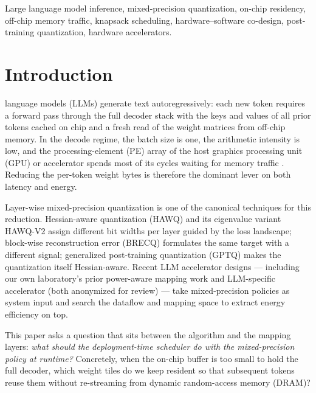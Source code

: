 \documentclass{ieeeaccess}
\begin{document}
\begin{keywords}
Large language model inference, mixed-precision quantization,
on-chip residency, off-chip memory traffic, knapsack scheduling,
hardware--software co-design, post-training quantization, hardware
accelerators.
\end{keywords}

\titlepgskip=-15pt

\maketitle

\section{Introduction}
\label{sec:introduction}
 language models (LLMs) generate text autoregressively:
each new token requires a forward pass through the full decoder stack
with the keys and values of all prior tokens cached on chip and a fresh
read of the weight matrices from off-chip memory. In the decode regime,
the batch size is one, the arithmetic intensity is low, and the
processing-element (PE) array of the host graphics processing unit (GPU)
or accelerator spends most of its cycles waiting for memory traffic
\cite{sheng2023flexgen}. Reducing the per-token weight bytes is
therefore the dominant lever on both latency and energy.

Layer-wise mixed-precision quantization is one of the canonical
techniques for this reduction. Hessian-aware quantization (HAWQ)
\cite{dong2019hawq} and its eigenvalue variant HAWQ-V2
\cite{dong2020hawqv2} assign different bit widths per layer guided by
the loss landscape; block-wise reconstruction error (BRECQ)
\cite{li2021brecq} formulates the same target with a different signal;
generalized post-training quantization (GPTQ) \cite{frantar2023gptq}
makes the quantization itself Hessian-aware. Recent LLM accelerator
designs --- including our own laboratory's prior power-aware mapping
work and LLM-specific accelerator (both anonymized for review) ---
take mixed-precision policies as system input and search the dataflow
and mapping space to extract energy efficiency on top.

This paper asks a question that sits between the algorithm and the
mapping layers: \emph{what should the deployment-time scheduler do with
the mixed-precision policy at runtime?} Concretely, when the on-chip
buffer is too small to hold the full decoder, which weight tiles do we
keep resident so that subsequent tokens reuse them without re-streaming
from dynamic random-access memory (DRAM)?
\end{document}
